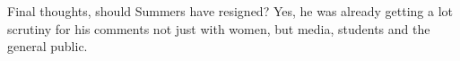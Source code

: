 \par
Final thoughts, should Summers have resigned? Yes, he was already 
getting a lot scrutiny for his comments not just with women, but 
media, students and the general public.
